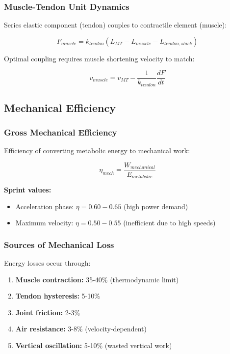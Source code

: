 \subsubsection{Muscle-Tendon Unit Dynamics}

Series elastic component (tendon) couples to contractile element (muscle):

\begin{equation}
F_{muscle} = k_{tendon} (L_{MT} - L_{muscle} - L_{tendon,slack})
\label{eq:mtu_force}
\end{equation}

Optimal coupling requires muscle shortening velocity to match:

\begin{equation}
v_{muscle} = v_{MT} - \frac{1}{k_{tendon}} \frac{dF}{dt}
\label{eq:mtu_velocity}
\end{equation}

\subsection{Mechanical Efficiency}

\subsubsection{Gross Mechanical Efficiency}

Efficiency of converting metabolic energy to mechanical work:

\begin{equation}
\eta_{mech} = \frac{W_{mechanical}}{E_{metabolic}}
\label{eq:gross_efficiency}
\end{equation}

\textbf{Sprint values:}
\begin{itemize}
\item Acceleration phase: $\eta = 0.60-0.65$ (high power demand)
\item Maximum velocity: $\eta = 0.50-0.55$ (inefficient due to high speeds)
\end{itemize}

\subsubsection{Sources of Mechanical Loss}

Energy losses occur through:

\begin{enumerate}
\item \textbf{Muscle contraction:} 35-40\% (thermodynamic limit)
\item \textbf{Tendon hysteresis:} 5-10\%
\item \textbf{Joint friction:} 2-3\%
\item \textbf{Air resistance:} 3-8\% (velocity-dependent)
\item \textbf{Vertical oscillation:} 5-10\% (wasted vertical work)
\end{enumerate}

